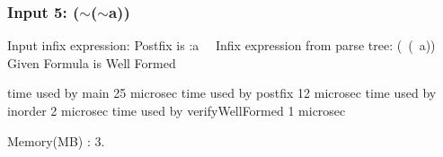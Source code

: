 \subsubsection*{Input 5\+: ($\sim$($\sim$a))}


\begin{DoxyCode}
Input infix expression: Postfix is :a~~
Infix expression from parse tree: (~(~a))
Given Formula is Well Formed


time used by main 25 microsec
time used by postfix 12 microsec
time used by inorder 2 microsec
time used by verifyWellFormed 1 microsec
\end{DoxyCode}


Memory(\+M\+B) \+: 3. 
